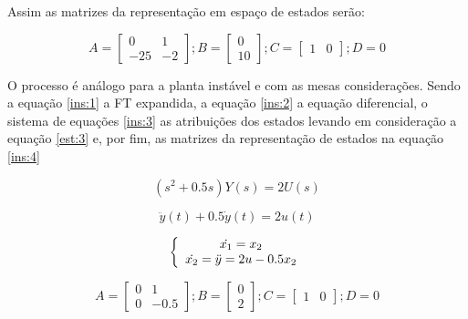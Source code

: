 Assim as matrizes da representação em espaço de estados serão:

\begin{equation} \label{est:5}
    A = \begin{bmatrix} 0 & 1 \\ -25 & -2  \end{bmatrix}; B = \begin{bmatrix} 0 \\ 10 \end{bmatrix}; C = \begin{bmatrix} 1 & 0  \end{bmatrix}; D = 0
\end{equation}

O processo é análogo para a planta instável e com as mesas considerações. Sendo a equação \ref{ins:1} a FT expandida, a equação \ref{ins:2} a equação diferencial, o sistema de equações \ref{ins:3} as atribuições dos estados levando em consideração a equação \ref{est:3} e, por fim, as matrizes da representação de estados na equação \ref{ins:4}

\begin{equation} \label{ins:1}
    (s^2+0.5s)Y(s) = 2U(s)
\end{equation}

\begin{equation} \label{ins:2}
    \ddot{y}(t) + 0.5\dot{y}(t) = 2u(t)
\end{equation}

\begin{equation} \label{ins:3}
\centering
\left \{
\begin{array}{cc}
\dot{x_1} = x_2 \\
\dot{x_2} = \ddot{y} = 2u - 0.5x_2\\
\end{array}
\right.
\end{equation}

\begin{equation} \label{ins:4}
    A = \begin{bmatrix} 0 & 1 \\ 0 & -0.5 \end{bmatrix}; B = \begin{bmatrix} 0 \\ 2 \end{bmatrix}; C = \begin{bmatrix} 1 & 0  \end{bmatrix}; D = 0
\end{equation}

